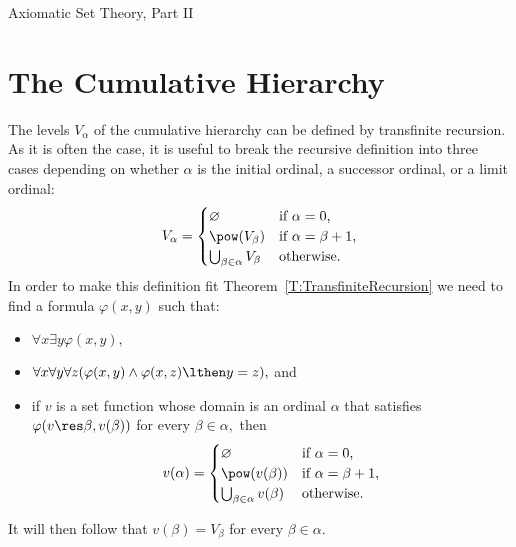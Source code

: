\begin{unit}{Axiomatic Set Theory, Part II}
\section{The Cumulative Hierarchy}

The levels \(V_\alpha\) of the cumulative hierarchy can be defined by transfinite recursion.
As it is often the case, it is useful to break the recursive definition into three cases depending on whether \(\alpha\) is the initial ordinal, a successor ordinal, or a limit ordinal: \[V_\alpha = \begin{cases}
  \varnothing & \text{if $\alpha = 0$,} \\
  \pow(V_\beta) & \text{if $\alpha = \beta+1$,} \\
  \bigcup_{\beta \in \alpha} V_\beta & \text{otherwise.}
\end{cases}\]
In order to make this definition fit Theorem~\ref{T:TransfiniteRecursion} we need to find a formula \(\varphi(x,y)\) such that: 
\begin{itemize}
\item \(\forall x \exists y \varphi(x,y),\) 
\item \(\forall x \forall y \forall z(\varphi(x,y) \land \varphi(x,z) \lthen y = z),\) and 
\item if \(v\) is a set function whose domain is an ordinal \(\alpha\) that satisfies \(\varphi(v \res \beta,v(\beta))\) for every \(\beta \in \alpha,\) then \[v(\alpha) = \begin{cases}
  \varnothing & \text{if $\alpha = 0$,} \\
  \pow(v(\beta)) & \text{if $\alpha = \beta+1$,} \\
  \bigcup_{\beta \in \alpha} v(\beta) & \text{otherwise.}
\end{cases}\]
\end{itemize}
It will then follow that \(v(\beta) = V_\beta\) for every \(\beta \in \alpha.\)


\end{unit}
